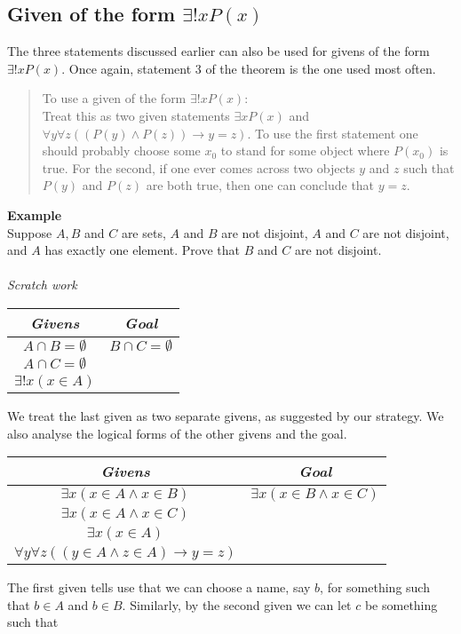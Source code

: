 \documentclass{report}
\theoremstyle{definition}
\begin{document}
\subsection{Given of the form $\exists!xP(x)$}
The three statements discussed earlier can also be used for givens of the form $\exists!xP(x)$. 
Once again, statement 3 of the theorem is the one used most often.
\begin{quote}
To use a given of the form $\exists!xP(x)$:\\
Treat this as two given statements $\exists xP(x)$ and $\forall y\forall z((P(y)\land P(z))\to y=z)$. To use the first statement one should probably choose some $x_0$ to stand for some object 
where $P(x_0)$ is true. For the second, if one ever comes across two objects $y$ and $z$ such that $P(y)$ and $P(z)$ are both true, then one can conclude that $y=z$.
\end{quote}
\textbf{Example}\\
Suppose $A,B$ and $C$ are sets, $A$ and $B$ are not disjoint, $A$ and $C$ are not disjoint, and $A$ has exactly one element. Prove that $B$ and $C$ are not disjoint.\\
\vspace{1mm}\\
\textit{Scratch work}
\begin{center}
\begin{tabular}{c|c}
\textit{Givens}&\textit{Goal}\\
\hline
$A\cap B=\emptyset$&$B\cap C=\emptyset$\\
$A\cap C=\emptyset$&\\
$\exists!x(x\in A)$&
\end{tabular}
\end{center}
We treat the last given as two separate givens, as suggested by our strategy. We also analyse the logical forms of the other givens and the goal.
\begin{center}
\begin{tabular}{c|c}
\textit{Givens}&\textit{Goal}\\
\hline
$\exists x(x\in A\land x\in B)$&$\exists x(x\in B\land x\in C)$\\
$\exists x(x\in A\land x\in C)$&\\
$\exists x(x\in A)$&\\
$\forall y\forall z((y\in A\land z\in A)\to y=z)$&
\end{tabular}
\end{center}
The first given tells use that we can choose a name, say $b$, for something such that $b\in A$ and $b\in B$. Similarly, by the second given we can let $c$ be something such that
\end{document}
